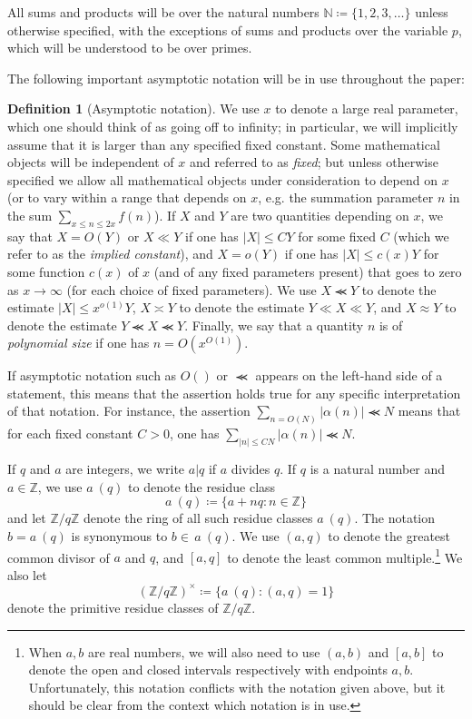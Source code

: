 \documentclass{bmcart}
\theoremstyle{plain}
\theoremstyle{definition}
\newtheorem{definition}[theorem]{Definition}
\newcommand\Z{\mathbb{Z}}
\newcommand\N{\mathbb{N}}
\renewcommand{\sim}{\asymp}
\renewcommand{\lessapprox}{\llcurly}
\begin{document}
All sums and products will be over the natural numbers $\N \coloneqq \{1,2,3,\ldots\}$ unless otherwise specified, with the exceptions of sums and products over the variable $p$, which will be understood to be over primes.

The following important asymptotic notation will be in use throughout the paper:

\begin{definition}[Asymptotic notation]\label{asym}  We use $x$ to denote a large real parameter, which one should think of as going off to infinity; in particular, we will implicitly assume that it is larger than any specified fixed constant. Some mathematical objects will be independent of $x$ and referred to as \emph{fixed}; but unless otherwise specified we allow all mathematical objects under consideration to depend on $x$ (or to vary within a range that depends on $x$, e.g. the summation parameter $n$ in the sum $\sum_{x \leq n \leq 2x} f(n)$).  If $X$ and $Y$ are two quantities depending on $x$, we say that $X = O(Y)$ or $X \ll Y$ if one has $|X| \leq CY$ for some fixed $C$ (which we refer to as the \emph{implied constant}), and $X = o(Y)$ if one has $|X| \leq c(x) Y$ for some function $c(x)$ of $x$ (and of any fixed parameters present) that goes to zero as $x \to \infty$ (for each choice of fixed parameters).  We use $X \lessapprox Y$ to denote the estimate $|X| \leq x^{o(1)} Y$, $X \sim Y$ to denote the estimate $Y \ll X \ll Y$, and $X \approx Y$ to denote the estimate $Y \lessapprox X \lessapprox Y$.  Finally, we say that a quantity $n$ is of \emph{polynomial size} if one has $n = O(x^{O(1)})$.

If asymptotic notation such as $O()$ or $\lessapprox$ appears on the left-hand side of a statement, this means that the assertion holds true for any specific interpretation of that notation.  For instance, the assertion $\sum_{n=O(N)} |\alpha(n)| \lessapprox N$ means that for each fixed constant $C>0$, one has $\sum_{|n| \leq CN} |\alpha(n)|\lessapprox N$.
\end{definition}

If $q$ and $a$ are integers, we write $a|q$ if $a$ divides $q$.
If $q$ is a natural number and $a \in \Z$, we use $a\ (q)$ to denote
the residue class
$$ a\ (q) \coloneqq \{ a+nq: n \in \Z \}$$
and let $\Z/q\Z$ denote the ring of all such residue classes $a\
(q)$. The notation $b=a\ (q)$ is synonymous to $b \in \, a \ (q)$. We
use $(a,q)$ to denote the greatest common divisor of $a$ and $q$, and
$[a,q]$ to denote the least common
multiple.\footnote{When $a,b$ are real numbers, we will also
  need to use $(a,b)$ and $[a,b]$ to denote the open and closed
  intervals respectively with endpoints $a,b$.  Unfortunately, this
  notation conflicts with the notation given above, but it should be
  clear from the context which notation is in use.}
We also let
$$ (\Z/q\Z)^\times \coloneqq \{ a\ (q): (a,q)=1 \}$$
denote the primitive residue classes of $\Z/q\Z$.  
\end{document}
